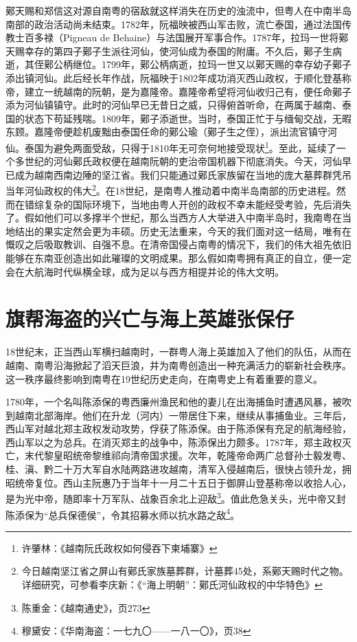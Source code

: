 鄚天赐和郑信这对源自南粤的宿敌就这样消失在历史的浊流中，但粤人在中南半岛南部的政治活动尚未结束。1782年，阮福映被西山军击败，流亡泰国，通过法国传教士百多禄（Pigneau de Behaine）与法国展开军事合作。1787年，拉玛一世将鄚天赐幸存的第四子鄚子生派往河仙，使河仙成为泰国的附庸。不久后，鄚子生病逝，其侄鄚公柄继位。1799年，鄚公柄病逝，拉玛一世又以鄚天赐的幸存幼子鄚子添出镇河仙。此后经长年作战，阮福映于1802年成功消灭西山政权，于顺化登基称帝，建立一统越南的阮朝，是为嘉隆帝。嘉隆帝希望将河仙收归己有，便任命鄚子添为河仙镇镇守。此时的河仙早已无昔日之威，只得俯首听命，在两属于越南、泰国的状态下苟延残喘。1809年，鄚子添逝世。当时，泰国正忙于与缅甸交战，无暇东顾。嘉隆帝便趁机废黜由泰国任命的鄚公瑜（鄚子生之侄），派出流官镇守河仙。泰国为避免两面受敌，只得于1810年无可奈何地接受现状\footnote{许肇林：《越南阮氏政权如何侵吞下柬埔寨》}。至此，延续了一个多世纪的河仙鄚氏政权便在越南阮朝的吏治帝国机器下彻底消失。今天，河仙早已成为越南西南边陲的坚江省。我们只能通过鄚氏家族留在当地的庞大墓葬群凭吊当年河仙政权的伟大\footnote{今日越南坚江省之屏山有鄚氏家族墓葬群，计墓葬45处，系鄚天赐时代之物。详细研究，可参看李庆新：《“海上明朝”：鄚氏河仙政权的中华特色》}。在18世纪，是南粤人推动着中南半岛南部的历史进程。然而在错综复杂的国际环境下，当地由粤人开创的政权不幸未能经受考验，先后消失了。假如他们可以多撑半个世纪，那么当西方人大举进入中南半岛时，我南粤在当地结出的果实定然会更为丰硕。历史无法重来，今天的我们面对这一结局，唯有在慨叹之后吸取教训、自强不息。在清帝国侵占南粤的情况下，我们的伟大祖先依旧能够在东南亚创造出如此璀璨的文明成果。那么假如南粤拥有真正的自立，便一定会在大航海时代纵横全球，成为足以与西方相提并论的伟大文明。

\section{旗帮海盗的兴亡与海上英雄张保仔}

\indent 18世纪末，正当西山军横扫越南时，一群粤人海上英雄加入了他们的队伍，从而在越南、南粤沿海掀起了滔天巨浪，并为南粤创造出一种充满活力的崭新社会秩序。这一秩序最终影响到南粤在19世纪历史走向，在南粤史上有着重要的意义。

1780年，一个名叫陈添保的粤西廉州渔民和他的妻儿在出海捕鱼时遭遇风暴，被吹到越南北部海岸。他们在升龙（河内）一带居住下来，继续从事捕鱼业。三年后，西山军对越北郑主政权发动攻势，俘获了陈添保。由于陈添保有充足的航海经验，西山军以之为总兵。在消灭郑主的战争中，陈添保出力颇多。1787年，郑主政权灭亡，末代黎皇昭统帝黎维祁向清帝国求援。次年，乾隆帝命两广总督孙士毅发粤、桂、滇、黔二十万大军自水陆两路进攻越南，清军入侵越南后，很快占领升龙，拥昭统帝复位。西山主阮惠乃于当年十一月二十五日于御屏山登基称帝以收拾人心，是为光中帝，随即率十万军队、战象百余北上迎敌\footnote{陈重金：《越南通史》，页273}。值此危急关头，光中帝又封陈添保为“总兵保德侯”，令其招募水师以抗水路之敌\footnote{穆黛安：《华南海盗：一七九〇——一八一〇》，页38}。

